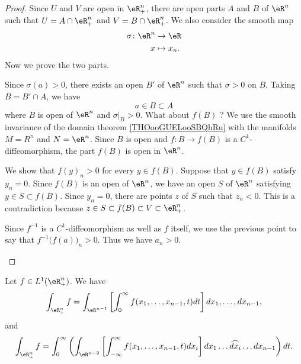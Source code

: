 \begin{proof}
	Since \( U\) and \( V\) are open in \( \eR^n_+\), there are open parts \( A\) and \( B\) of \( \eR^n\) such that \( U=A\cap \eR^n_+\) and \( V=B\cap \eR^n_+\). We also consider the smooth map
	\begin{equation}
		\begin{aligned}
			\sigma\colon \eR^n & \to \eR      \\
			x                  & \mapsto x_n.
		\end{aligned}
	\end{equation}
	Now we prove the two  parts.
	\begin{subproof}
		\spitem[Suppose \( a_n>0\)]
		Since \( \sigma(a)>0\), there exists an open \( B'\) of \( \eR^n\) such that \( \sigma>0\) on \( B\). Taking \( B=B'\cap A\), we have
		\begin{equation}
			a\in B\subset A
		\end{equation}
		where \( B\) is open of \( \eR^n\) and \( \sigma|_B>0\). What about \( f(B)\) ? We use the smooth invariance of the domain theorem \ref{THOooGUELooSBQhRu} with the manifolds \( M=R^n\) and \( N=\eR^n\). Since \( B\) is open and \(f \colon B\to f(B)  \) is a \( C^1\)-diffeomorphism, the part \( f(B)\) is open in \( \eR^n\).

		We show that \( f(y)_n>0\) for every \( y\in f(B)\). Suppose that \( y\in f(B)\) satisfy \( y_n=0\). Since \( f(B)\) is an open of \( \eR^n\), we have an open \( S\) of \( \eR^n\) satisfying \( y\in S\subset f(B)\). Since \( y_n=0\), there are points \( z\) of \( S\) such that \( z_n<0\). This is a contradiction because \( z\in S\subset f(B)\subset V\subset \eR^n_+\).

		\spitem[Suppose \( f(a)_n>0\)]
		Since \( f^{-1}\) is a \( C^1\)-diffeomorphism as well as \( f\) itself, we use the previous point to say that \( f^{-1}\big( f(a) \big)_n>0\). Thus we have \( a_n>0\).
	\end{subproof}
\end{proof}


\begin{lemma}	\label{LEMooYWBHooDTjCyf}
	Let \( f\in L^1(\eR^n_+)\). We have
	\begin{equation}
		\int_{\eR^n_+}f=\int_{\eR^{n-1}}\left[  \int_0^{\infty}f(x_1,\ldots,x_{n-1},t)dt \right]dx_1,\ldots,dx_{n-1},
	\end{equation}
	and
	\begin{equation}
		\int_{\eR^n_+}f=\int_0^{\infty}\left(    \int_{\eR^{n-2}} \left[  \int_{-\infty}^{\infty}f(x_1,\ldots,x_{n-1}, t)dx_i \right]dx_1\ldots \widehat{dx_i}\ldots dx_{n-1}   \right)dt.
	\end{equation}
\end{lemma}


